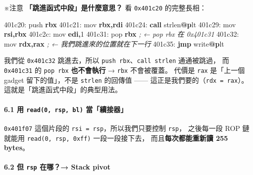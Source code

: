 \documentclass[10pt,a4paper]{article}
\newenvironment{Shaded}{\begin{snugshade}}{\end{snugshade}}
\newcommand{\BuiltInTok}[1]{#1}
\newcommand{\CommentTok}[1]{\textcolor[rgb]{0.56,0.35,0.01}{\textit{#1}}}
\newcommand{\ControlFlowTok}[1]{\textcolor[rgb]{0.13,0.29,0.53}{\textbf{#1}}}
\newcommand{\DecValTok}[1]{\textcolor[rgb]{0.00,0.00,0.81}{#1}}
\newcommand{\ErrorTok}[1]{\textcolor[rgb]{0.64,0.00,0.00}{\textbf{#1}}}
\newcommand{\FunctionTok}[1]{\textcolor[rgb]{0.13,0.29,0.53}{\textbf{#1}}}
\newcommand{\KeywordTok}[1]{\textcolor[rgb]{0.13,0.29,0.53}{\textbf{#1}}}
\newcommand{\NormalTok}[1]{#1}
\newcommand{\OperatorTok}[1]{\textcolor[rgb]{0.81,0.36,0.00}{\textbf{#1}}}
\renewenvironment{Shaded}{%
  \def\FrameCommand{\fboxsep=3.2pt\colorbox{shadecolor}}%
  \MakeFramed{\advance\hsize-\width\FrameRestore\small}%
}{%
  \endMakeFramed
}
\renewenvironment{quote}{%
  \begin{mdframed}[linewidth=0pt,innerleftmargin=0pt,innerrightmargin=0pt,
    innerbottommargin=0pt,innertopmargin=0pt,skipabove=0.55em,skipbelow=0.55em,
    leftmargin=0.9em,rightmargin=0.4em,startcode={\color{quotebar}\vrule width 2.6pt},%
    endcode={}]%
  \itshape\color{black}%
}{%
  \end{mdframed}%
}
\begin{document}
\begin{quote}
※注意 \textbf{「跳進函式中段」是什麼意思？} 看 \texttt{0x401c20}
的完整長相：

\begin{Shaded}
\begin{Highlighting}[]
\NormalTok{401c20:  }\BuiltInTok{push} \KeywordTok{rbx}
\NormalTok{401c21:  }\BuiltInTok{mov}  \KeywordTok{rbx}\OperatorTok{,}\KeywordTok{rdi}
\NormalTok{401c24:  }\ControlFlowTok{call}\NormalTok{ strlen}\FunctionTok{@}\ErrorTok{p}\NormalTok{lt}
\NormalTok{401c29:  }\BuiltInTok{mov}  \KeywordTok{rsi}\OperatorTok{,}\KeywordTok{rbx}
\NormalTok{401c2c:  }\BuiltInTok{mov}  \KeywordTok{edi}\OperatorTok{,}\DecValTok{1}
\NormalTok{401c31:  }\BuiltInTok{pop}  \KeywordTok{rbx}          \CommentTok{; ← pop rbx 在 0x401c31}
\NormalTok{401c32:  }\BuiltInTok{mov}  \KeywordTok{rdx}\OperatorTok{,}\KeywordTok{rax}      \CommentTok{; ← 我們跳進來的位置就在下一行}
\NormalTok{401c35:  }\ControlFlowTok{jmp}\NormalTok{  write}\FunctionTok{@}\ErrorTok{p}\NormalTok{lt}
\end{Highlighting}
\end{Shaded}

我們從 \texttt{0x401c32} 跳進去，所以
\texttt{push\ \allowbreak{}rbx}、\texttt{call\ \allowbreak{}strlen} 通通被跳過， 而
\texttt{0x401c31} 的 \texttt{pop\ \allowbreak{}rbx} \textbf{也不會執行} →
\texttt{rbx} 不會被覆蓋。 代價是 \texttt{rax} 是「上一個 gadget
留下的值」，不是 \texttt{strlen} 的回傳值 ------
這正是我們要的（\texttt{rdx\ \allowbreak{}=\ \allowbreak{}rax}）。這就是「跳進函式中段」的典型用法。
\end{quote}

\paragraph{\texorpdfstring{6.1 用 \texttt{read(0,\allowbreak{}\ \allowbreak{}rsp,\allowbreak{}\ \allowbreak{}bl)}
當「續接器」}{6.1 用 read(0, rsp, bl) 當「續接器」}}\label{ux7528-read0-rsp-bl-ux7576ux7e8cux63a5ux5668}

\texttt{0x401f07} 這個片段的 \texttt{rsi\ \allowbreak{}=\ \allowbreak{}rsp}，所以我們只要控制
\texttt{rsp}， 之後每一段 ROP 鏈就能用 \texttt{read(0,\allowbreak{}\ \allowbreak{}rsp,\allowbreak{}\ \allowbreak{}0xff)}
一段一段接下去， 而且\textbf{每次都能重新讀 255 bytes}。

\paragraph{\texorpdfstring{6.2 但 \texttt{rsp} 在哪？→ Stack
pivot}{6.2 但 rsp 在哪？→ Stack pivot}}\label{ux4f46-rsp-ux5728ux54ea-stack-pivot}
\end{document}
